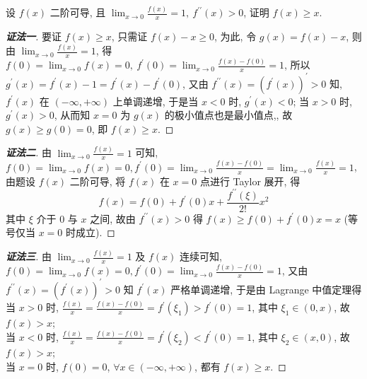 \begin{example}[1995 数学 (二)]
    设 $ f(x) $ 二阶可导, 且 $ \displaystyle\lim _{x \rightarrow 0} \frac{f(x)}{x}=1,~f^{\prime \prime}(x)>0$, 
    证明 $ f(x) \geqslant x .$
\end{example}

\begin{proof}[{\songti \textbf{证法一}}]
    要证 $ f(x) \geqslant x$, 只需证 $ f(x)-x \geqslant 0$, 为此, 令 $ g(x)=f(x)-x$, 则由 $\displaystyle \lim _{x \rightarrow 0} \frac{f(x)}{x}=1$, 
    得 $\displaystyle f(0)=\lim _{x \rightarrow 0} f(x)=0,~f^{\prime}(0)=\lim _{x \rightarrow 0} \frac{f(x)-f(0)}{x}=1$, 
    所以 $ g^{\prime}(x)=f^{\prime}(x)-1=f^{\prime}(x)-f^{\prime}(0)$, 
    又由 $ f^{\prime \prime}(x)=\left(f^{\prime}(x)\right)^{\prime}>0 $ 知, $f^{\prime}(x)$  在 $ (-\infty,+\infty)$ 上单调递增, 
    于是当 $ x<0 $ 时, $g^{\prime}(x)<0$; 当 $ x>0 $ 时, $g^{\prime}(x)>0$, 从而知 $ x=0 $ 为 $ g(x) $ 的极小值点也是最小值点,, 
    故 $ g(x) \geqslant g(0)=0$, 即 $ f(x) \geqslant x .$
\end{proof}
\begin{proof}[{\songti \textbf{证法二}}]
    由 $\displaystyle \lim _{x \rightarrow 0} \frac{f(x)}{x}=1 $ 可知, $\displaystyle f(0)=\lim _{x \rightarrow 0} f(x)=0, f^{\prime}(0)=\lim _{x \rightarrow 0} \frac{f(x)-f(0)}{x}= \lim _{x \rightarrow 0} \frac{f(x)}{x}=1$, 
    由题设 $ f(x) $ 二阶可导, 将 $ f(x) $ 在 $ x=0 $ 点进行 Taylor 展开, 得
    $$f(x)=f(0)+f^{\prime}(0) x+\frac{f^{\prime \prime}(\xi)}{2 !} x^{2}$$
    其中 $ \xi $ 介于 $0$ 与 $ x $ 之间, 
    故由 $ f^{\prime \prime}(x)>0 $ 得 $ f(x) \geqslant f(0)+f^{\prime}(0) x=x $ (等号仅当 $ x=0 $ 时成立).
\end{proof}
\begin{proof}[{\songti \textbf{证法三}}]
    由 $\displaystyle \lim _{x \rightarrow 0} \frac{f(x)}{x}=1 $ 及 $ f(x) $ 连续可知, $\displaystyle f(0)=\lim _{x \rightarrow 0} f(x)=0, f^{\prime}(0)= \lim _{x \rightarrow 0} \frac{f(x)-f(0)}{x}=1$, 
    又由 $ f^{\prime \prime}(x)=\left(f^{\prime}(x)\right)^{\prime}>0 $ 知 $ f^{\prime}(x) $ 严格单调递增,  于是由 Lagrange 中值定理得\\
    当 $ x>0 $ 时, $\displaystyle\frac{f(x)}{x}=\frac{f(x)-f(0)}{x}=f^{\prime}\left(\xi_{1}\right)>f^{\prime}(0)=1$, 其中 $ \xi_{1} \in(0, x)$, 故 $ f(x)>x$; \\
    当 $ x<0 $ 时, $\displaystyle\frac{f(x)}{x}=\frac{f(x)-f(0)}{x}=f^{\prime}\left(\xi_{2}\right)<f^{\prime}(0)=1$, 其中 $ \xi_{2} \in(x, 0)$, 故 $ f(x)>x$; \\
    当 $ x=0 $ 时, $f(0)=0$, $\forall x \in(-\infty,+\infty)$, 都有 $ f(x) \geqslant x .$
\end{proof}

